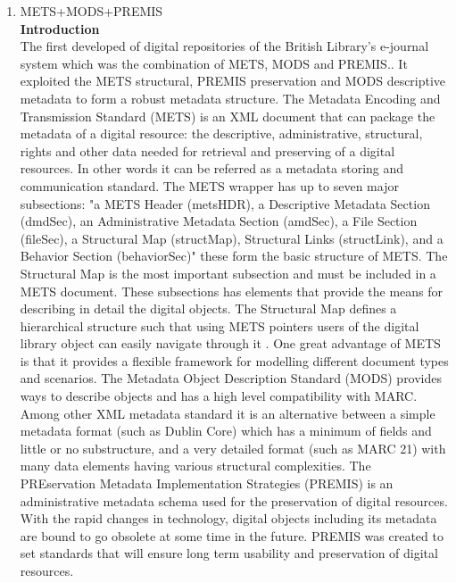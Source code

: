\begin{enumerate}
	\item METS+MODS+PREMIS\\
	{\bf Introduction}\\
	The first developed of digital repositories of the British Library's e-journal system which was the combination of METS, MODS and PREMIS..\cite{Dappert2008} It exploited the METS structural, PREMIS preservation and MODS descriptive metadata to form a robust metadata structure. The Metadata Encoding and Transmission Standard (METS) is an XML document that can package the metadata of a digital resource: the descriptive, administrative, structural, rights and other data needed for retrieval and preserving of a digital resources.\cite{Guenther2003} In other words it can be referred as a metadata storing and communication standard. The METS wrapper has up to seven major subsections: "a METS Header (metsHDR), a Descriptive Metadata Section (dmdSec), an Administrative Metadata Section (amdSec), a File Section (fileSec), a Structural Map (structMap), Structural Links (structLink), and a Behavior Section (behaviorSec)" these form the basic structure of METS. The Structural Map is the most important subsection and must be included in a METS document.\cite{Cheslow2014} These subsections has elements that provide the means for describing in detail the digital objects. The Structural Map defines a hierarchical structure such that using METS pointers users of the digital library object can easily navigate through it . One great advantage of METS is that it provides a flexible framework for modelling different document types and scenarios.\cite{Dappert2008}
	The Metadata Object Description Standard (MODS) provides ways to describe objects and has a high level compatibility with MARC. Among other XML metadata standard it is an alternative between a simple metadata format (such as Dublin Core) which has a minimum of fields and little or no substructure, and a very detailed format (such as MARC 21) with many data elements having various structural complexities.\cite{Guenther2003}
	The PREservation Metadata Implementation Strategies (PREMIS) is an administrative metadata schema used for the preservation of digital resources.\cite{Cheslow2014} With the rapid changes in technology, digital objects including its metadata are bound to go obsolete at some time in the future. PREMIS was created to set standards that will ensure long term usability and preservation of digital resources.
	

\end{enumerate}
